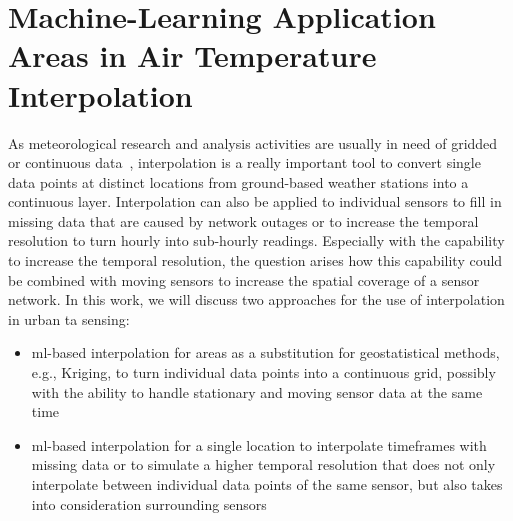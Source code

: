 \section{Machine-Learning Application Areas in Air Temperature Interpolation}

As meteorological research and analysis activities are usually in need of gridded or continuous data~\cite{sekulic2020spatio}, interpolation is a really important tool to convert single data points at distinct locations from ground-based weather stations into a continuous layer. Interpolation can also be applied to individual sensors to fill in missing data that are caused by network outages or to increase the temporal resolution to turn hourly into sub-hourly readings. Especially with the capability to increase the temporal resolution, the question arises how this capability could be combined with moving sensors to increase the spatial coverage of a sensor network. In this work, we will discuss two approaches for the use of interpolation in urban \gls{ta} sensing:

\begin{itemize}
    \item \gls{ml}-based interpolation for areas as a substitution for geostatistical methods, e.g., Kriging, to turn individual data points into a continuous grid, possibly with the ability to handle stationary and moving sensor data at the same time
    \item \gls{ml}-based interpolation for a single location to interpolate timeframes with missing data or to simulate a higher temporal resolution that does not only interpolate between individual data points of the same sensor, but also takes into consideration surrounding sensors
\end{itemize}

